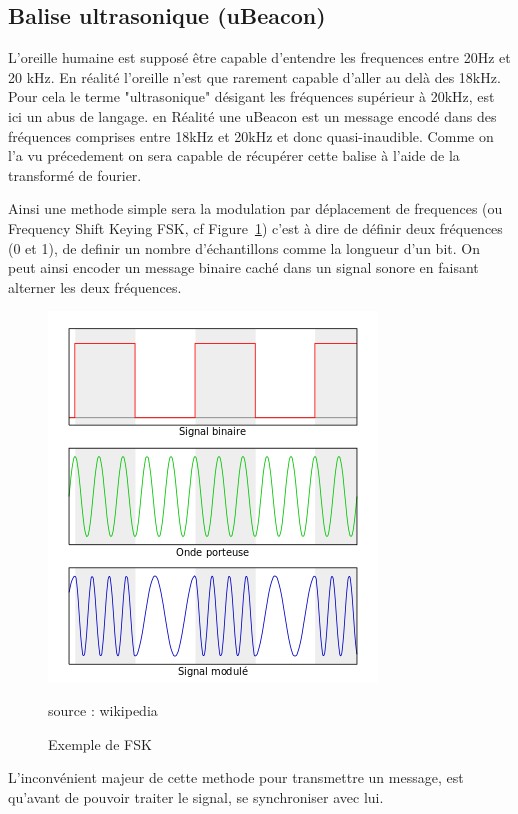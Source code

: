 \documentclass[12pt]{article}
\begin{document}
\subsection{Balise ultrasonique (uBeacon)}
L'oreille humaine est supposé être capable d'entendre les frequences entre 20Hz et 20 kHz. En réalité l'oreille n'est que rarement capable d'aller au delà des 18kHz.\\
Pour cela le terme "ultrasonique" désigant les fréquences supérieur à 20kHz, est ici un abus de langage. en Réalité une uBeacon est un message encodé dans des fréquences comprises entre 18kHz et 20kHz et donc quasi-inaudible. Comme on l'a vu précedement on sera capable de récupérer cette balise à l'aide de la transformé de fourier.

Ainsi une methode simple sera la modulation par déplacement de frequences (ou Frequency Shift Keying FSK, cf Figure~\ref{fig:fskExemple}) c'est à dire de définir deux fréquences (0 et 1), de definir un nombre d'échantillons comme la longueur d'un bit. On peut ainsi encoder un message binaire caché dans un signal sonore en faisant alterner les deux fréquences.

\begin{figure}[H]
\begin{center}
\caption{Exemple de FSK}
\label{fig:fskExemple}
\includegraphics[scale=0.75]{FSK.png}

\tiny{source : wikipedia}
\end{center}
\end{figure}
 
L'inconvénient majeur de cette methode pour transmettre un message, est qu'avant de pouvoir traiter le signal, se synchroniser avec lui.
\end{document}
